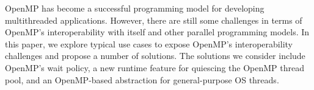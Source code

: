 OpenMP has become a successful programming model
for developing multithreaded applications.
However, there are still some challenges in terms of OpenMP's interoperability
with itself and other parallel programming models.
In this paper, we explore typical use cases to expose OpenMP's interoperability challenges and
propose a number of solutions.
The solutions we consider include OpenMP's wait policy,
a new runtime feature for quiescing the OpenMP thread pool,
and an OpenMP-based abstraction for general-purpose OS threads.
